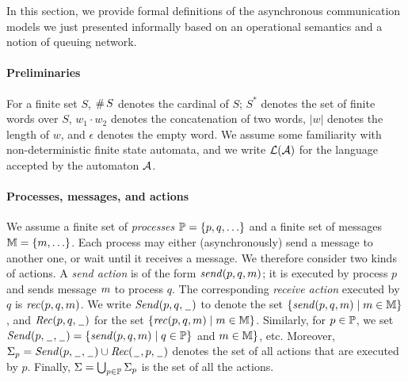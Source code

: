 
In this section, we provide formal definitions of the asynchronous communication models we just presented 
informally based on an operational semantics and a notion of queuing network.

\paragraph{\bf Preliminaries}
For a finite set $S$, $\#\,S$ denotes the cardinal of $S$; $S^*$ denotes the set of finite words over $S$,
$w_1\cdot w_2$ denotes the concatenation of two words, $|w|$ denotes the length of $w$, and $\epsilon$ denotes the empty word. We assume some familiarity with non-deterministic
finite state automata,
and we write $\mathcal L(\mathcal{A})$ for the language accepted
by the automaton $\mathcal{A}$. 


\paragraph{\bf Processes, messages, and actions}
We assume a finite set of \emph{processes} $\mathbb{P}=\{p,q,\ldots\}$ and a finite set of messages $\mathbb{M}=\{m,\ldots\}$. 
Each process may either (asynchronously) send a message to another one, or wait until it receives a message.
We therefore consider two kinds of actions. A \emph{send action} is of the form $\mathit{send}(p, q, m)$;
it is executed by process $p$ and sends message $m$ to process $q$.
The corresponding \emph{receive action} executed by $q$ is $\mathit{rec}(p, q, m)$.
%
We write ${\mathit{Send}(p,q,\hspace{0.1em}\underline{\hspace{0.5em}}\hspace{0.1em})}$ to denote the set $\{\mathit{send}(p, q, m) \mid m \in \mathbb{M}\}$, and
${\mathit{Rec}(p,q,\hspace{0.1em}\underline{\hspace{0.5em}}\hspace{0.1em})}$ for the set $\{\mathit{rec}(p, q, m) \mid m \in \mathbb{M}\}$.
Similarly, for $p \in \mathbb{P}$, we set
${\mathit{Send}(p,\hspace{0.1em}\underline{\hspace{0.5em}}\hspace{0.1em},\hspace{0.1em}\underline{\hspace{0.5em}}\hspace{0.1em})} = \{\mathit{send}(p, q, m) \mid q \in \mathbb{P} 
\}$ and $m \in \mathbb{M}\}$, etc.
Moreover, $\Sigma_{p} = {\mathit{Send}(p,\hspace{0.1em}\underline{\hspace{0.5em}}\hspace{0.1em},\hspace{0.1em}\underline{\hspace{0.5em}}\hspace{0.1em})} \cup {\mathit{Rec}(\hspace{0.1em}\underline{\hspace{0.5em}}\hspace{0.1em},p,\hspace{0.1em}\underline{\hspace{0.5em}}\hspace{0.1em})}$ denotes the set of all actions that are
executed by $p$.
Finally, $\Sigma = \bigcup_{p \in \mathbb{P}} \Sigma_{p}$
is the set of all the actions.

